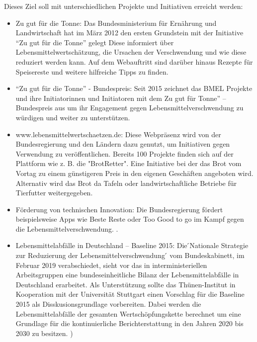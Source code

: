 Dieses Ziel soll mit unterschiedlichen Projekte und Initiativen erreicht werden: 
\begin{itemize}
  \item Zu gut für die Tonne: Das Bundesministerium für Ernährung und Landwirtschaft hat im März 2012 den ersten Grundstein mit der Initiative “Zu gut für die Tonne” gelegt %
  Diese informiert über Lebensmittelwertschätzung, die Ursachen der Verschwendung und wie diese reduziert werden kann. Auf dem Webauftritt sind darüber hinaus Rezepte für Speisereste und weitere hilfreiche Tipps zu finden. %

  \item “Zu gut für die Tonne” - Bundespreis: Seit 2015 zeichnet das BMEL Projekte und ihre Initiatorinnen und Initiatoren mit dem Zu gut für Tonne” – Bundespreis aus um ihr Engagement gegen Lebensmittelverschwendung zu würdigen und weiter zu unterstützen. %

  \item www.lebensmittelwertschaetzen.de: Diese Webpräsenz wird von der Bundesregierung und den Ländern dazu genutzt, um Initiativen gegen Verwendung zu veröffentlichen. Bereits 100 Projekte finden sich auf der Plattform wie z. B. die "BrotRetter". %
   Eine Initiative bei der das Brot vom Vortag zu einem günstigeren Preis in den eigenen Geschäften angeboten wird. Alternativ wird das Brot da Tafeln oder landwirtschaftliche Betriebe für Tierfutter weitergegeben. %
   

  \item Förderung von technischen Innovation: Die Bundesregierung fördert beispielsweise Apps wie Beste Reste oder Too Good to go im Kampf gegen die Lebensmittelverschwendung. .%

  \item Lebensmittelabfälle in Deutschland – Baseline 2015: Die ́Nationale Strategie zur Reduzierung der Lebensmittelverschwendung ́ vom Bundeskabinett, im Februar 2019 verabschiedet, sieht vor das in interministeriellen Arbeitsgruppen eine bundeseinheitliche Bilanz der Lebensmittelabfälle in Deutschland erarbeitet. Als Unterstützung sollte das Thünen-Institut in Kooperation mit der Universität Stuttgart einen Vorschlag für die Baseline 2015 als Disskusionsgrundlage vorbereiten. Dabei werden die Lebensmittelabfälle der gesamten Wertschöpfungskette berechnet um eine Grundlage für die kontinuierliche Berichterstattung in den Jahren 2020 bis 2030 zu besitzen. %
)\end{itemize}


